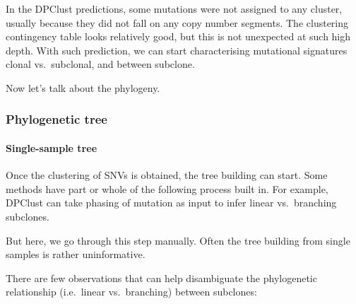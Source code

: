 \documentclass[]{article}
\let\oldparagraph\paragraph
\renewcommand{\paragraph}[1]{\oldparagraph{#1}\mbox{}}
\begin{document}
In the DPClust predictions, some mutations were not assigned to any
cluster, usually because they did not fall on any copy number segments.
The clustering contingency table looks relatively good, but this is not
unexpected at such high depth. With such prediction, we can start
characterising mutational signatures clonal vs.~subclonal, and between
subclone.

Now let's talk about the phylogeny.

\newpage

\hypertarget{phylogenetic-tree}{%
\subsubsection{Phylogenetic tree}\label{phylogenetic-tree}}

\hypertarget{single-sample-tree}{%
\paragraph{Single-sample tree}\label{single-sample-tree}}

Once the clustering of SNVs is obtained, the tree building can start.
Some methods have part or whole of the following process built in. For
example, DPClust can take phasing of mutation as input to infer linear
vs.~branching subclones.

But here, we go through this step manually. Often the tree building from
single samples is rather uninformative.

There are few observations that can help disambiguate the phylogenetic
relationship (i.e.~linear vs.~branching) between subclones:
\end{document}
